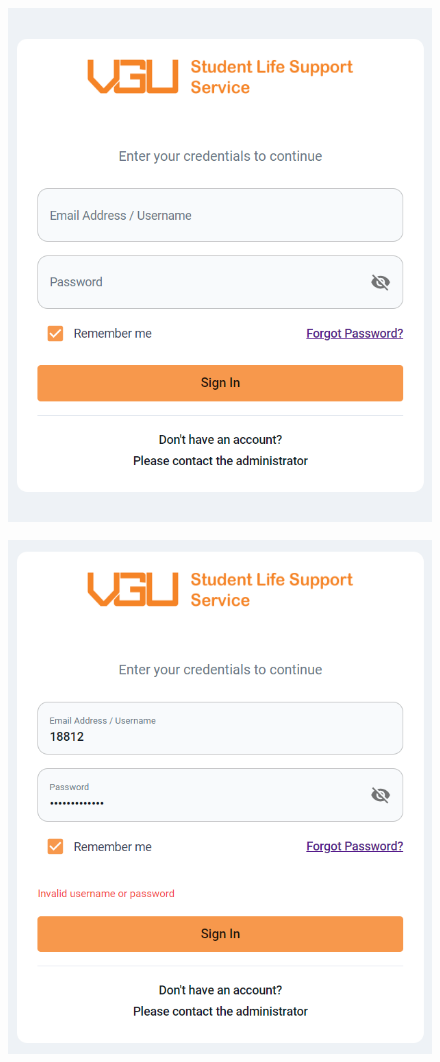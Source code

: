 \begin{figure}[H]
	\centering
	\begin{minipage}{.5\textwidth}
		\centering
		\includegraphics[width=.9\linewidth]{graphics/gui/user/login.png}
		\label{fig:gui-login}
	\end{minipage}%
	\begin{minipage}{.5\textwidth}
		\centering
		\includegraphics[width=0.9\linewidth]{graphics/gui/user/login-error.png}
		\label{fig:gui-login-failed}
	\end{minipage}
\end{figure}
